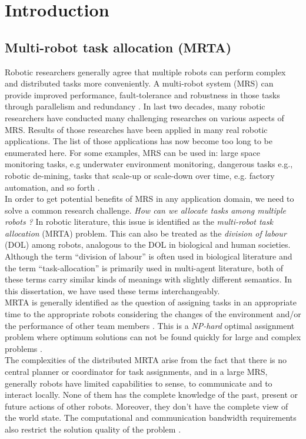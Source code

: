\chapter{Introduction}
\label{intro}
\section{Multi-robot task allocation (MRTA)}
\label{intro:mrta}
Robotic researchers generally agree that multiple robots can perform complex and distributed tasks more conveniently. A multi-robot system (MRS) can provide improved performance, fault-tolerance and robustness in those tasks through parallelism and redundancy \cite{Arkin1998,Parker+2006,Mataric2007}. In last two decades, many robotic researchers have conducted many challenging researches on various aspects of MRS. Results of those researches have been applied   in many real robotic applications. The list of those applications has now become too long to be enumerated here. For some examples, MRS can be used in: large space monitoring tasks, e.g underwater environment monitoring, dangerous tasks e.g., robotic de-mining, tasks that scale-up or scale-down over time, e.g. factory automation, and so forth \cite{Sahin+2005}.\\
In order to get potential benefits of MRS in any application domain, we need to solve a common research challenge. \textit{How can we allocate tasks among multiple robots ?} In robotic literature,  this issue is identified as the \textit{multi-robot task allocation} (MRTA) problem. This can also be treated as the \textit{division of labour} (DOL) among robots, analogous to the DOL in biological  and human societies. Although the term ``division of labour'' is often used in biological literature and the term ``task-allocation'' is primarily used in multi-agent literature, both of these terms carry similar kinds of meanings with slightly different semantics. In this dissertation, we have used these terms interchangeably.\\
MRTA is generally identified as the question of assigning tasks in an appropriate time to the appropriate robots considering the changes of the environment and/or the performance of other team members \cite{Gerkey+2004}. This is a {\em NP-hard} optimal assignment problem where optimum solutions can not be found quickly for large and complex problems \cite{Parker2008}.\\
The complexities of the distributed MRTA arise from the fact that there is no central planner or coordinator for task assignments, and in a large MRS, generally robots have limited capabilities to sense, to communicate and to interact locally. None of them has the complete knowledge of the past, present or future actions of other robots. Moreover, they don't have the complete view of the world state. The computational and communication bandwidth requirements also restrict the solution quality of the problem \cite{Gerkey+2004}.\\
